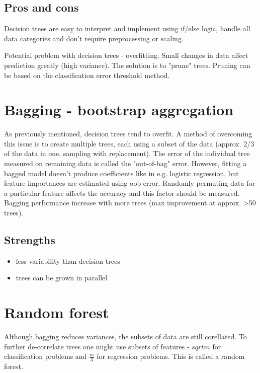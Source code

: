 \documentclass[11pt]{book}
\begin{document}
\subsection{Pros and cons}    
    
Decision trees are easy to interpret and implement using if/else logic, handle all data categories and don't require preprocessing or scaling.    
    
Potential problem with decision trees - overfitting. Small changes in data affect prediction greatly (high variance). The solution is to "prune" trees. Pruning can be based on the classification error threshold method.

\section{Bagging - bootstrap aggregation}

As previously mentioned, decision trees tend to overfit. A method of overcoming this issue is to create multiple trees, each using a subset of the data (approx. 2/3 of the data in one, sampling with replacement). The error of the individual tree measured on remaining data is called the "out-of-bag" error. However, fitting a bagged model doesn't produce coefficients like in e.g. logistic regression, but feature importances are estimated using oob error. Randomly permuting data for a particular feature affects the accuracy and this factor should be measured. Bagging performance increase with more trees (max improvement at approx. >50 trees).

\subsection{Strengths}
\begin{itemize}
    \item less variability than decision trees
    \item trees can be grown in parallel
\end{itemize}

\section{Random forest}

Although bagging reduces variances, the subsets of data are still corellated. To further de-correlate trees one might use subsets of features - $sqrt{m}$ for classification problems and $\frac{m}{3}$ for regression problems. This is called a random forest. 
\end{document}
